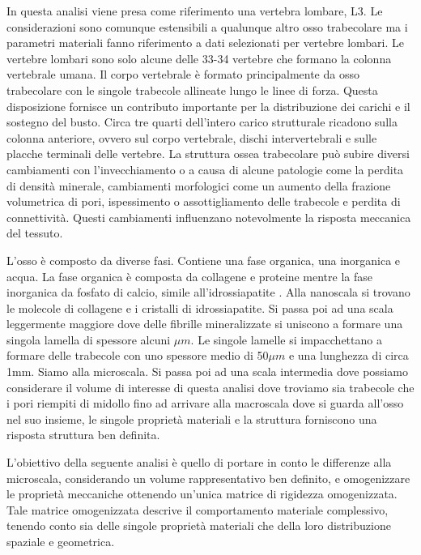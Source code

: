 \documentclass[a4paper,num-refs]{oup-contemporary}
\begin{document}
In questa analisi viene presa come riferimento una vertebra lombare, L3. Le considerazioni sono comunque estensibili a qualunque altro osso trabecolare ma i parametri materiali fanno riferimento a dati selezionati per vertebre lombari.  
Le vertebre lombari sono solo alcune delle 33-34 vertebre che formano la colonna vertebrale umana. Il corpo vertebrale è formato principalmente da osso trabecolare con le singole trabecole allineate lungo le linee di forza. Questa disposizione fornisce un contributo importante per la distribuzione dei carichi e il sostegno del busto. Circa tre quarti dell'intero carico strutturale ricadono sulla colonna anteriore, ovvero sul corpo vertebrale, dischi intervertebrali e sulle placche terminali delle vertebre. La struttura ossea trabecolare può subire diversi cambiamenti con l'invecchiamento o a causa di alcune patologie \citep{Ferguson:2003} come la perdita di densità minerale, cambiamenti morfologici come un aumento della frazione volumetrica di pori, ispessimento o assottigliamento delle trabecole e perdita di connettività. Questi cambiamenti influenzano notevolmente la risposta meccanica del tessuto. 

L'osso è composto da diverse fasi. Contiene una fase organica, una inorganica e acqua. La fase organica è composta da collagene e proteine mentre la fase inorganica da fosfato di calcio, simile all'idrossiapatite \citep{Hamed:2012}. Alla nanoscala si trovano le molecole di collagene e i cristalli di idrossiapatite. Si passa poi ad una scala leggermente maggiore dove delle fibrille mineralizzate si uniscono a formare una singola lamella di spessore alcuni $\mu m$. Le singole lamelle si impacchettano a formare delle trabecole con uno spessore medio di 50$\mu m$ e una lunghezza di circa 1mm. Siamo alla microscala. Si passa poi ad una scala intermedia dove possiamo considerare il volume di interesse di questa analisi dove troviamo sia trabecole che i pori riempiti di midollo fino ad arrivare alla macroscala dove si guarda all'osso nel suo insieme, le singole proprietà materiali e la struttura forniscono una risposta struttura ben definita. 

L'obiettivo della seguente analisi è quello di portare in conto le differenze alla microscala, considerando un volume rappresentativo ben definito, e omogenizzare le proprietà meccaniche ottenendo un'unica matrice di rigidezza omogenizzata.  Tale matrice omogenizzata descrive il comportamento materiale complessivo, tenendo conto sia delle singole proprietà materiali che della loro distribuzione spaziale e geometrica.
\end{document}
